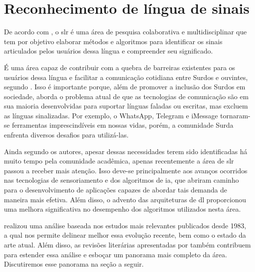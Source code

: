 \section{Reconhecimento de língua de sinais}
\label{sec:slr}

De acordo com , o \acrfull{slr} é uma área de pesquisa colaborativa e multidisciplinar que tem por objetivo elaborar métodos e algoritmos para identificar os sinais articulados pelos usuários dessa língua e compreender seu significado.



É uma área capaz de contribuir com a quebra de barreiras existentes para os usuários dessa língua e facilitar a comunicação cotidiana entre Surdos e ouvintes, segundo .
Isso é importante porque, além de promover a inclusão dos Surdos em sociedade, aborda o problema atual de que as tecnologias de comunicação são em sua maioria desenvolvidas para suportar línguas faladas ou escritas, mas excluem as línguas sinalizadas. Por exemplo, o WhatsApp, Telegram e iMessage tornaram-se ferramentas imprescindíveis em nossas vidas, porém, a comunidade Surda enfrenta diversos desafios para utilizá-las.

Ainda segundo os autores, apesar dessas necessidades terem sido identificadas há muito tempo pela comunidade acadêmica, apenas recentemente a área de \acrshort{slr} passou a receber mais atenção.
Isso deve-se principalmente aos avanços ocorridos nas tecnologias de sensoriamento e dos algoritmos de \acrlong{ia}, que abriram caminho para o desenvolvimento de aplicações capazes de abordar tais demanda de maneira mais efetiva. 
Além disso, o advento das arquiteturas de \acrlong{dl} proporcionou uma melhora significativa no desempenho dos algoritmos utilizados nesta área.

 realizou uma análise baseada nos estudos mais relevantes publicados desde 1983, a qual nos permite delinear melhor essa evolução recente, bem como o estado da arte atual.
Além disso, as revisões literárias apresentadas por  também contribuem para estender essa análise e esboçar um panorama mais completo da área. Discutiremos esse panorama na seção a seguir.




